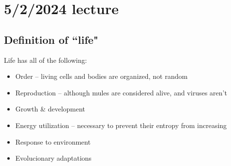 \documentclass[class=article, crop=false]{standalone}
\begin{document}
\section{5/2/2024 lecture}
\subsection{Definition of ``life"}
Life has all of the following:
\begin{itemize}
    \item Order -- living cells and bodies are organized, not random
    \item Reproduction -- although mules are considered alive, and viruses aren't
    \item Growth \& development
    \item Energy utilization -- necessary to prevent their entropy from increasing
    \item Response to environment
    \item Evolucionary adaptations
\end{itemize}
\end{document}
